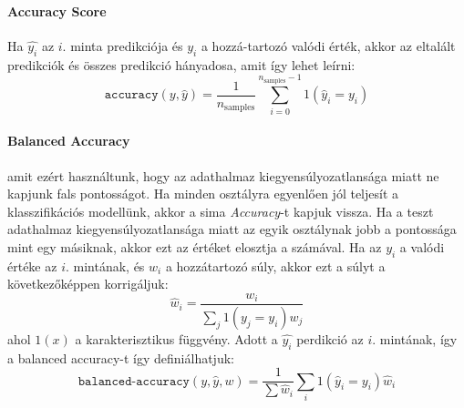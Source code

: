 \documentclass[acmtog, authorversion]{acmart}
\begin{document}
\paragraph{Accuracy Score}
Ha \begin{math}\hat{y_i}\end{math} az \begin{math}i\end{math}. minta predikciója és \begin{math}y_i\end{math} a hozzá-tartozó valódi érték,
akkor az eltalált predikciók és összes predikció hányadosa, amit így lehet leírni:\break
\begin{equation}
\texttt{accuracy}(y, \hat{y}) = \frac{1}{n_\text{samples}} \sum_{i=0}^{n_\text{samples}-1} 1(\hat{y}_i = y_i)
\end{equation}
\paragraph{Balanced Accuracy}
amit ezért használtunk, hogy az adathalmaz kiegyensúlyozatlansága miatt ne kapjunk fals pontosságot. Ha minden osztályra egyenlően jól teljesít a klasszifikációs modellünk, akkor a sima \emph{Accuracy}-t kapjuk vissza.
Ha a teszt adathalmaz kiegyensúlyozatlansága miatt az egyik osztálynak jobb a pontossága mint egy másiknak, akkor ezt az értéket
elosztja a számával. Ha az \begin{math}y_i\end{math} a valódi értéke az \begin{math}i\end{math}. mintának, és
\begin{math}w_i\end{math} a hozzátartozó súly, akkor ezt a súlyt a következőképpen korrigáljuk:
\begin{equation}
    \hat{w}_i = \frac{w_i}{\sum_j{1(y_j = y_i) w_j}}
\end{equation}
ahol \begin{math}1(x)\end{math} a karakterisztikus függvény. Adott a \begin{math}\hat{y_i}\end{math} perdikció az \begin{math}i\end{math}.
mintának, így a balanced accuracy-t így definiálhatjuk:
\begin{equation}
    \texttt{balanced-accuracy}(y, \hat{y}, w) = \frac{1}{\sum{\hat{w}_i}} \sum_i 1(\hat{y}_i = y_i) \hat{w}_i
\end{equation}
\end{document}
